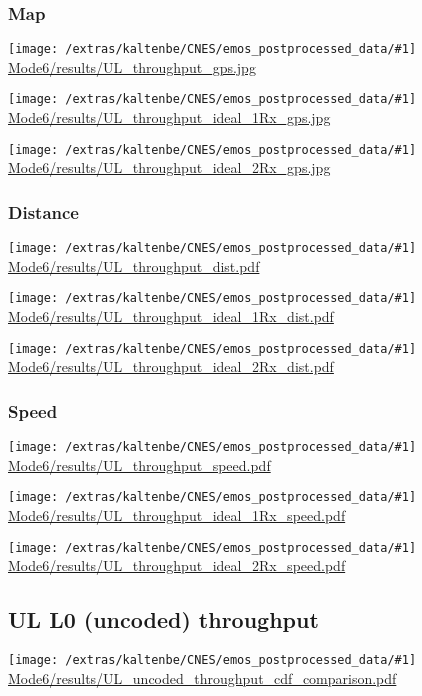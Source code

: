 \documentclass[a4paper,10pt]{article}
\newcommand{\printfile}[1]{
 \begin{minipage}{8cm}
  \centering
  \texttt{[image: /extras/kaltenbe/CNES/emos\_postprocessed\_data/\#1]}
  \url{#1}

 \end{minipage}
}
\begin{document}
\subsubsection{Map}
\printfile{Mode6/results/UL_throughput_gps.jpg}
\printfile{Mode6/results/UL_throughput_ideal_1Rx_gps.jpg}
\printfile{Mode6/results/UL_throughput_ideal_2Rx_gps.jpg}

\subsubsection{Distance}
\printfile{Mode6/results/UL_throughput_dist.pdf}
\printfile{Mode6/results/UL_throughput_ideal_1Rx_dist.pdf}
\printfile{Mode6/results/UL_throughput_ideal_2Rx_dist.pdf}

\subsubsection{Speed}
\printfile{Mode6/results/UL_throughput_speed.pdf}
\printfile{Mode6/results/UL_throughput_ideal_1Rx_speed.pdf}
\printfile{Mode6/results/UL_throughput_ideal_2Rx_speed.pdf}

\subsection{UL L0 (uncoded) throughput}

\printfile{Mode6/results/UL_uncoded_throughput_cdf_comparison.pdf}
\end{document}
